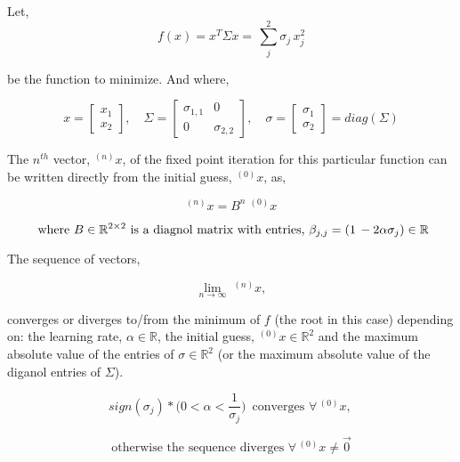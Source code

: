 \documentclass[11pt]{article}
\begin{document}
    Let, \[
f(x) = x^T \Sigma x = \, \sum_{j}^{2} \sigma_{j} \, x_{j}^{2}
\]

be the function to minimize. And where,

    \begin{equation}
x = \begin{bmatrix}
x_1 \\
x_2 
\end{bmatrix},
\quad
\Sigma = \begin{bmatrix}
\sigma_{1,1} & 0\\
0 & \sigma_{2,2}
\end{bmatrix},
\quad
\sigma = \begin{bmatrix}
\sigma_{1} \\
\sigma_{2}
\end{bmatrix}
= diag(\Sigma)
\end{equation}

    The \(n^{th}\) vector, \(^{(n)}x\), of the fixed point iteration for
this particular function can be written directly from the initial guess,
\(^{(0)}x\), as,

    \begin{equation} \tag{2}
^{(n)}x = B^n \; ^{(0)}x
\end{equation}

\[
\\
\text{ where $B \in \mathbb{R}^{2 \times 2}$ is a diagnol matrix with entries, } \\
\\
\beta_{j,j} = (1 \, - 2 \alpha \sigma_j ) \in \mathbb{R}
\]

    The sequence of vectors,

\[
\lim_{n \rightarrow \infty} \; ^{(n)}x,
\]

converges or diverges to/from the minimum of \(f\) (the root in this
case) depending on: the learning rate, \(\alpha \in \mathbb{R}\), the
initial guess, \(^{(0)}x \in \mathbb{R}^2\) and the maximum absolute
value of the entries of \(\sigma \in \mathbb{R}^2\) (or the maximum
absolute value of the diganol entries of \(\Sigma\)).

\begin{equation}
 sign(\sigma_{j})* \Big( 0 < \alpha < \frac{1}{\sigma_{j}} \Big) \, \text{ converges } \forall \, ^{(0)}x \text{, }
\end{equation}

\begin{equation}
  \text{otherwise the sequence diverges } \forall \, ^{(0)}x \neq \vec{0}
\end{equation}
\end{document}
